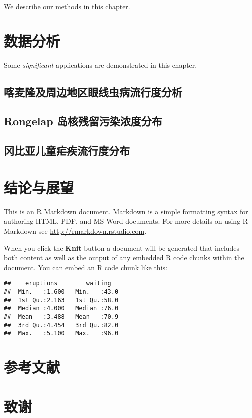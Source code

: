 \documentclass[]{ctexbook}
\theoremstyle{definition}
\theoremstyle{definition}
\theoremstyle{definition}
\theoremstyle{remark}
\begin{document}
We describe our methods in this chapter.

\chapter{数据分析}

Some \emph{significant} applications are demonstrated in this chapter.

\section{喀麦隆及周边地区眼线虫病流行度分析}

\section{Rongelap 岛核残留污染浓度分布}\label{rongelap-}

\section{冈比亚儿童疟疾流行度分布}

\chapter{结论与展望}\label{summary}

This is an R Markdown document. Markdown is a simple formatting syntax
for authoring HTML, PDF, and MS Word documents. For more details on
using R Markdown see \url{http://rmarkdown.rstudio.com}.

When you click the \textbf{Knit} button a document will be generated
that includes both content as well as the output of any embedded R code
chunks within the document. You can embed an R code chunk like this:

\begin{verbatim}
##    eruptions        waiting    
##  Min.   :1.600   Min.   :43.0  
##  1st Qu.:2.163   1st Qu.:58.0  
##  Median :4.000   Median :76.0  
##  Mean   :3.488   Mean   :70.9  
##  3rd Qu.:4.454   3rd Qu.:82.0  
##  Max.   :5.100   Max.   :96.0
\end{verbatim}

\chapter*{参考文献}

\chapter*{致谢}\label{ack}
\end{document}
